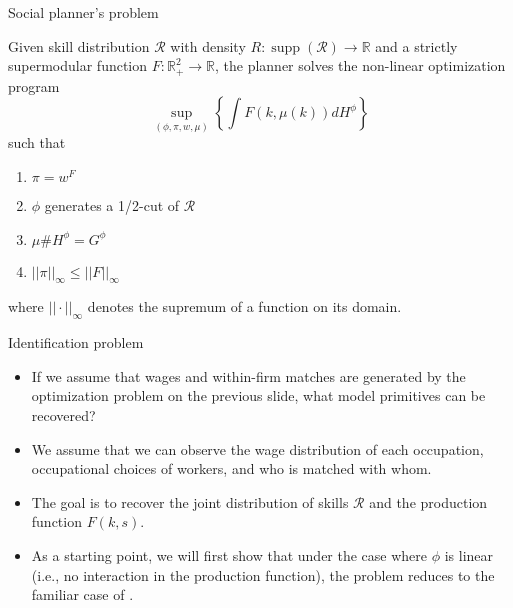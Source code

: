 \documentclass{beamer}
\DeclareMathOperator\supp{supp}
\begin{document}
	\begin{frame}{Social planner's problem}
		\begin{problem}
			Given skill distribution $\mathcal{R}$ with density $R:\supp(\mathcal{R}) \to \mathbb{R}$ and a strictly supermodular function $F:\mathbb{R}^2_+ \to \mathbb{R}$, the planner solves the non-linear optimization program
			\begin{equation*}
				\sup_{(\phi,\pi,w,\mu)} \left\{\int F(k,\mu(k))dH^\phi\right\} 
			\end{equation*}
			such that
			\smallskip
			\begin{enumerate}
				\item $\pi = w^F$
				\item $\phi$ generates a 1/2-cut of $\mathcal{R}$ 
				\item $\mu\#H^\phi = G^{\phi}$
				\item $||\pi||_{\infty} \leq ||F||_\infty$
			\end{enumerate}
			\smallskip
			where $||\cdot||_\infty$ denotes the supremum of a function on its domain.
		\end{problem}
	\end{frame}
	
	\begin{frame}{Identification problem}
		\begin{itemize}
			\item If we assume that wages and within-firm matches are generated by the optimization problem on the previous slide, what model primitives can be recovered?
			\bigskip
			\item We assume that we can observe the wage distribution of each occupation, occupational choices of workers, and who is matched with whom.
			\bigskip
			\item The goal is to recover the joint distribution of skills $\mathcal{R}$ and the production function $F(k,s)$.
			\bigskip
			\item As a starting point, we will first show that under the case where $\phi$ is linear  (i.e., no interaction in the production function), the problem reduces to the familiar case of \citet{heckman1990empirical}.
		\end{itemize}
	\end{frame}
	
\end{document}

